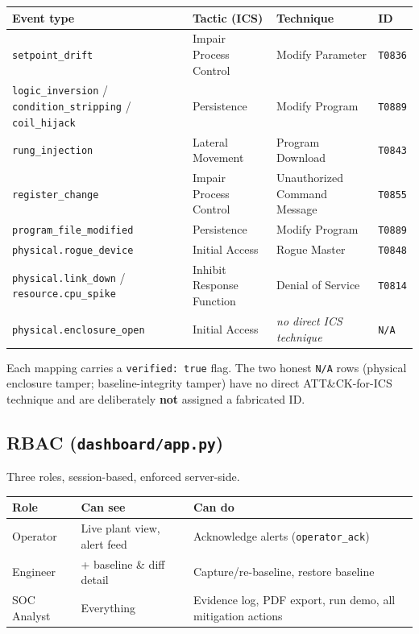 \documentclass[11pt,a4paper]{article}
\newcommand{\code}[1]{\texttt{\small #1}}
\begin{document}
\begin{tabularx}{\textwidth}{@{}L L p{3.2cm} p{1.9cm}@{}}
\toprule
\textbf{Event type} & \textbf{Tactic (ICS)} & \textbf{Technique} & \textbf{ID} \\
\midrule
\code{setpoint\_drift} & Impair Process Control & Modify Parameter & \code{T0836} \\
\code{logic\_inversion} / \code{condition\_stripping} / \code{coil\_hijack} & Persistence & Modify Program & \code{T0889} \\
\code{rung\_injection} & Lateral Movement & Program Download & \code{T0843} \\
\code{register\_change} & Impair Process Control & Unauthorized Command Message & \code{T0855} \\
\code{program\_file\_modified} & Persistence & Modify Program & \code{T0889} \\
\code{physical.rogue\_device} & Initial Access & Rogue Master & \code{T0848} \\
\code{physical.link\_down} / \code{resource.cpu\_spike} & Inhibit Response Function & Denial of Service & \code{T0814} \\
\code{physical.enclosure\_open} & Initial Access & \emph{no direct ICS technique} & \code{N/A} \\
\bottomrule
\end{tabularx}

\begin{keybox}
Each mapping carries a \code{verified: true} flag. The two honest \code{N/A} rows (physical enclosure
tamper; baseline-integrity tamper) have no direct ATT\&CK-for-ICS technique and are deliberately
\textbf{not} assigned a fabricated ID.
\end{keybox}

\subsection{RBAC (\texttt{dashboard/app.py})}
Three roles, session-based, enforced server-side.

\begin{tabularx}{\textwidth}{@{}p{2.6cm} L L@{}}
\toprule
\textbf{Role} & \textbf{Can see} & \textbf{Can do} \\
\midrule
Operator & Live plant view, alert feed & Acknowledge alerts (\code{operator\_ack}) \\
Engineer & + baseline \& diff detail & Capture/re-baseline, restore baseline \\
SOC Analyst & Everything & Evidence log, PDF export, run demo, all mitigation actions \\
\bottomrule
\end{tabularx}
\end{document}
